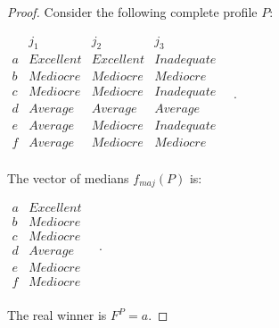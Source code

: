 \documentclass[version=3.21, pagesize, twoside=off, bibliography=totoc, DIV=calc, fontsize=12pt, a4paper]{scrartcl}
\begin{document}
\begin{proof} Consider the following complete profile $P$:
	\begin{center}
		$
		\begin{array}{cccc}
			  & j_1 & j_2 & j_3 \\
			a &	Excellent	& Excellent & Inadequate\\
			b &	Mediocre	& Mediocre	& Mediocre\\
			c &	Mediocre	& Mediocre & Inadequate\\
			d &	Average	& Average	& Average\\
			e &	Average	& Mediocre	& Inadequate \\
			f &	Average	& Mediocre & Mediocre	  \\
		\end{array} \quad.
		$
	\end{center}
	The vector of medians $f_{maj}(P)$ is:
	\begin{center}
		$
		\begin{array}{cc}
			a &	Excellent \\
			b &	Mediocre \\
			c &	Mediocre \\
			d &	Average	\\
			e &	Mediocre \\
			f & Mediocre \\
		\end{array} \quad.
		$
	\end{center}
	The real winner is $F^P=a$. 
	

\end{proof}
\end{document}
